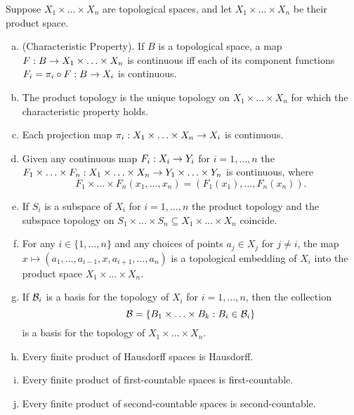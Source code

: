\documentclass[11pt,a4paper]{article}
\begin{document}
\begin{proposition}\label{prop:product_topology}
Suppose $X_1\times\ldots\times X_n$ are topological spaces, and let $X_1\times\ldots\times X_n$ be their product space.
\begin{enumerate}[(a)]
    \item (Characteristic Property). If $B$ is a topological space, a map $F:B\rightarrow X_1\times\ldots\times X_n$ is continuous iff each of its component functions $F_i = \pi_i\circ F:B\rightarrow X_i$ is continuous.
    \item The product topology is the unique topology on $X_1\times\ldots\times X_n$ for which the characteristic property holds.
    \item Each projection map $\pi_i:X_1\times\ldots\times X_n\rightarrow X_i$ is continuous.
    \item Given any continuous map $F_i:X_i\rightarrow Y_i$ for $i=1,\ldots,n$ the  $F_1\times \ldots\times F_n:X_1\times\ldots\times X_n\rightarrow Y_1\times\ldots\times Y_n$ is continuous, where 
    \begin{equation*}
    F_1\times \ldots\times F_n(x_1,\ldots,x_n) = (F_1(x_1),\ldots,F_n(x_n)).
    \end{equation*}
    \item If $S_i$ is a subspace of $X_i$ for $i=1,\ldots,n$ the product topology and the subspace topology on $S_1\times\ldots\times S_n\subseteq X_1\times\ldots\times X_n$ coincide.
    \item For any $i\in \{1,\ldots,n\}$ and any choices of points $a_j\in X_j$ for $j\neq i$, the map $x\mapsto (a_1,\ldots,a_{i-1},x,a_{i+1},\ldots,a_n)$ is a topological embedding of $X_i$ into the product space $X_1\times\ldots\times X_n$.
    \item If $\mathcal{B}_i$ is a basis for the topology of $X_i$ for $i = 1,\ldots,n$, then the collection $$\mathcal{B} = \{B_1\times \ldots\times B_k:B_i\in\mathcal{B}_i\}$$ is a basis for the topology of $X_1\times\ldots\times X_n$.
    \item Every finite product of Hausdorff spaces is Hausdorff.
    \item Every finite product of first-countable spaces is first-countable.
    \item Every finite product of second-countable spaces is second-countable.
\end{enumerate}
\end{proposition}
\end{document}
